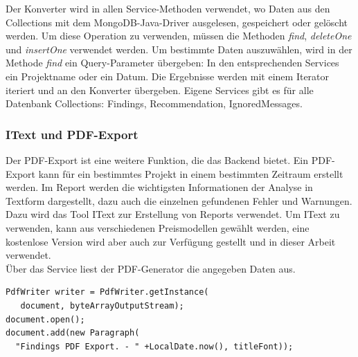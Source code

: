 Der Konverter wird in allen Service-Methoden verwendet, wo Daten aus den Collections mit dem MongoDB-Java-Driver ausgelesen, gespeichert oder gelöscht werden. Um diese Operation zu verwenden, müssen die Methoden \textit{find}, \textit{deleteOne} und \textit{insertOne} verwendet werden. Um bestimmte Daten auszuwählen, wird in der Methode \textit{find} ein Query-Parameter übergeben: In den entsprechenden Services ein Projektname oder ein Datum. Die Ergebnisse werden mit einem Iterator iteriert und an den Konverter übergeben. Eigene Services gibt es für alle Datenbank Collections: Findings, Recommendation, IgnoredMessages.

\subsubsection{IText und PDF-Export}
Der PDF-Export ist eine weitere Funktion, die das Backend bietet. Ein PDF-Export kann für ein bestimmtes Projekt in einem bestimmten Zeitraum erstellt werden. Im Report werden die wichtigsten Informationen der Analyse in Textform dargestellt, dazu auch die einzelnen gefundenen Fehler und Warnungen. \\
Dazu wird das Tool IText zur Erstellung von Reports verwendet.  \cite{lowagie2011itext} Um IText zu verwenden, kann aus verschiedenen Preismodellen gewählt werden, eine kostenlose Version wird aber auch zur Verfügung gestellt und in dieser Arbeit verwendet.  \\
Über das Service liest der PDF-Generator die angegeben Daten aus.

\lstset{
  caption={Initialisierung des Writers um im Dokument einen Paragraph zu erstellen.}, 
  basicstyle=\small\ttfamily, 
  label=lst:main, 
  language=Java,
  frame=single,
  breaklines=true, %
  postbreak=\mbox{\textcolor{red}{$\hookrightarrow$}\space},
}

\begin{samepage}%
	\begin{lstlisting}[float=tbhp]
PdfWriter writer = PdfWriter.getInstance(
   document, byteArrayOutputStream);
document.open();
document.add(new Paragraph(
  "Findings PDF Export. - " +LocalDate.now(), titleFont));

	\end{lstlisting}
\end{samepage}

